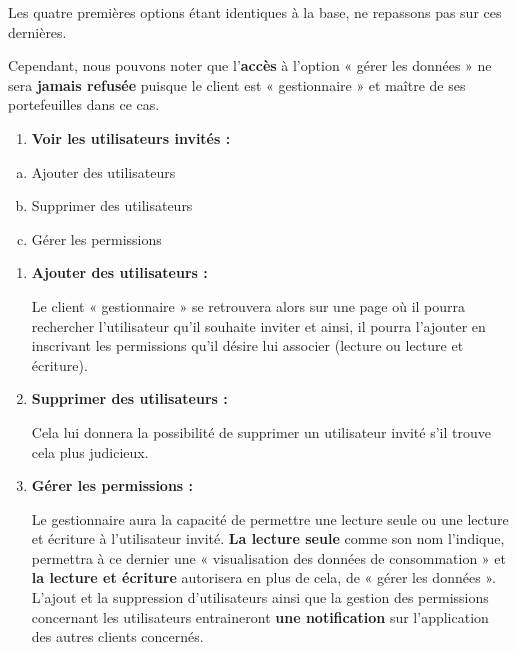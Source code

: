 \begin{flushleft}
Les quatre premières options étant identiques à la base, ne repassons pas sur ces dernières.
\end{flushleft}

\begin{flushleft}
Cependant, nous pouvons noter que l’\textbf{accès} à l’option « gérer les données » ne sera \textbf{jamais refusée} puisque le client est « gestionnaire » et maître de ses portefeuilles dans ce cas.
\end{flushleft}

\begin{enumerate}[-]
\item \textbf{Voir les utilisateurs invités : }
\end{enumerate}

\begin{enumerate}[a)]
\item Ajouter des utilisateurs
\item Supprimer des utilisateurs
\item Gérer les permissions
\end{enumerate}

\begin{enumerate}[-]

\item \textbf{Ajouter des utilisateurs :}

Le client « gestionnaire » se retrouvera alors sur une page où il pourra rechercher l’utilisateur qu’il souhaite inviter et ainsi, il pourra l’ajouter en inscrivant les permissions qu’il désire lui associer (lecture ou lecture et écriture).

\item \textbf{Supprimer des utilisateurs :}

Cela lui donnera la possibilité de supprimer un utilisateur invité s’il trouve cela plus judicieux.

\item \textbf{Gérer les permissions :}

Le gestionnaire aura la capacité de permettre une lecture seule ou une lecture et écriture à l’utilisateur invité.
\newline
\textbf{La lecture seule} comme son nom l’indique, permettra à ce dernier une « visualisation des données de consommation » et \textbf{la lecture et écriture} autorisera en plus de cela, de « gérer les données ».
\newline
L’ajout et la suppression d'utilisateurs ainsi que la gestion des permissions concernant les utilisateurs entraineront \textbf{une notification} sur l’application des autres clients concernés.

\end{enumerate}

